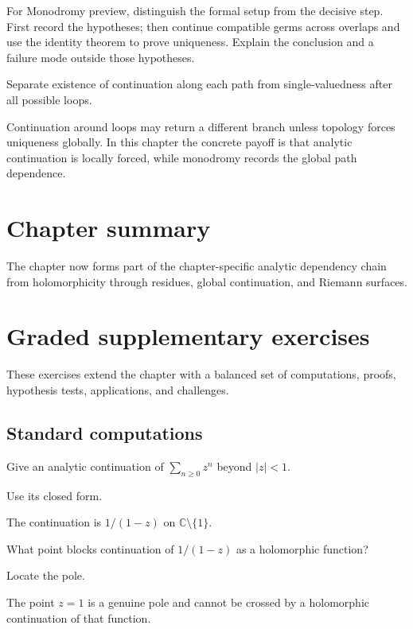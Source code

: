 \begin{exercise}\label{exr:iv15-08}
For Monodromy preview, distinguish the formal setup from the decisive step. First record the hypotheses; then continue compatible germs across overlaps and use the identity theorem to prove uniqueness. Explain the conclusion and a failure mode outside those hypotheses.
\end{exercise}
\begin{hint}
Separate existence of continuation along each path from single-valuedness after all possible loops.
\end{hint}
\begin{solution}
Continuation around loops may return a different branch unless topology forces uniqueness globally. In this chapter the concrete payoff is that analytic continuation is locally forced, while monodromy records the global path dependence.
\end{solution}

\section*{Chapter summary}
The chapter now forms part of the chapter-specific analytic dependency chain from holomorphicity through residues, global continuation, and Riemann surfaces.
\section{Graded supplementary exercises}
These exercises extend the chapter with a balanced set of computations, proofs, hypothesis tests, applications, and challenges.

\subsection*{Standard computations}

\begin{exercise}\label{exr:iv15-expand-01}
Give an analytic continuation of \(\sum_{n\ge0}z^n\) beyond \(|z|<1\).
\end{exercise}
\begin{hint}
Use its closed form.
\end{hint}
\begin{solution}
The continuation is \(1/(1-z)\) on \(\mathbb C\setminus\{1\}\).
\end{solution}

\begin{exercise}\label{exr:iv15-expand-02}
What point blocks continuation of \(1/(1-z)\) as a holomorphic function?
\end{exercise}
\begin{hint}
Locate the pole.
\end{hint}
\begin{solution}
The point \(z=1\) is a genuine pole and cannot be crossed by a holomorphic continuation of that function.
\end{solution}

